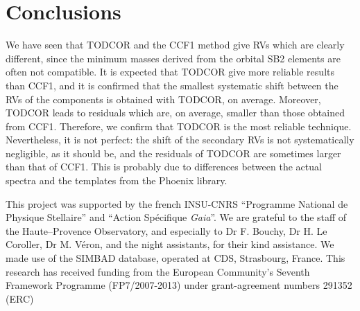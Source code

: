 \documentclass{sf2a-conf2017}
\begin{document}
\section{Conclusions}

We have seen that TODCOR and the CCF1 method give RVs which are clearly different, since the minimum masses
derived from the orbital SB2 elements are often not compatible. It is expected that TODCOR give more
reliable results than CCF1, and it is confirmed that the smallest systematic shift between the RVs of the components
is obtained with TODCOR, on average. Moreover, TODCOR leads to residuals which are, on average, smaller than
those obtained from CCF1. Therefore, we confirm that TODCOR is the most reliable technique. Nevertheless, it
is not perfect: the shift of the secondary RVs is not systematically negligible, as it should be, and the
residuals of TODCOR are sometimes larger than that of CCF1. This is probably due to differences between the
actual spectra and the templates from the Phoenix library.

\begin{acknowledgements}
This project was supported by the french INSU-CNRS ``Programme National de Physique Stellaire''
and ``Action Sp\'{e}cifique {\it Gaia}''. We are grateful to the staff of the
Haute--Provence Observatory, and especially to Dr F. Bouchy, Dr H. Le Coroller, Dr M. V\'{e}ron, and the night assistants, for their
kind assistance. We made use of the SIMBAD database, operated at CDS, Strasbourg, France. This research has received funding from the European Community's Seventh Framework Programme (FP7/2007-2013) under grant-agreement numbers 291352 (ERC)
\end{acknowledgements}

\end{document}
